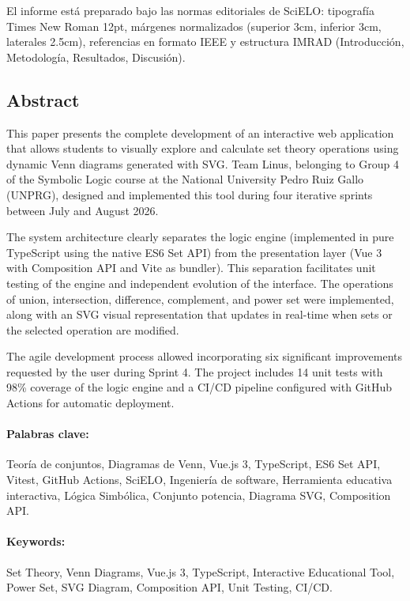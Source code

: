 \documentclass[11pt,a4paper]{article}
\begin{document}
El informe está preparado bajo las normas editoriales de SciELO: tipografía Times New Roman 12pt, márgenes normalizados (superior 3cm, inferior 3cm, laterales 2.5cm), referencias en formato IEEE y estructura IMRAD (Introducción, Metodología, Resultados, Discusión).

\subsection*{Abstract}
This paper presents the complete development of an interactive web application that allows students to visually explore and calculate set theory operations using dynamic Venn diagrams generated with SVG. Team Linus, belonging to Group 4 of the Symbolic Logic course at the National University Pedro Ruiz Gallo (UNPRG), designed and implemented this tool during four iterative sprints between July and August 2026.

The system architecture clearly separates the logic engine (implemented in pure TypeScript using the native ES6 Set API) from the presentation layer (Vue 3 with Composition API and Vite as bundler). This separation facilitates unit testing of the engine and independent evolution of the interface. The operations of union, intersection, difference, complement, and power set were implemented, along with an SVG visual representation that updates in real-time when sets or the selected operation are modified.

The agile development process allowed incorporating six significant improvements requested by the user during Sprint 4. The project includes 14 unit tests with 98\% coverage of the logic engine and a CI/CD pipeline configured with GitHub Actions for automatic deployment.

\paragraph{Palabras clave:} Teoría de conjuntos, Diagramas de Venn, Vue.js 3, TypeScript, ES6 Set API, Vitest, GitHub Actions, SciELO, Ingeniería de software, Herramienta educativa interactiva, Lógica Simbólica, Conjunto potencia, Diagrama SVG, Composition API.

\paragraph{Keywords:} Set Theory, Venn Diagrams, Vue.js 3, TypeScript, Interactive Educational Tool, Power Set, SVG Diagram, Composition API, Unit Testing, CI/CD.
\end{document}
